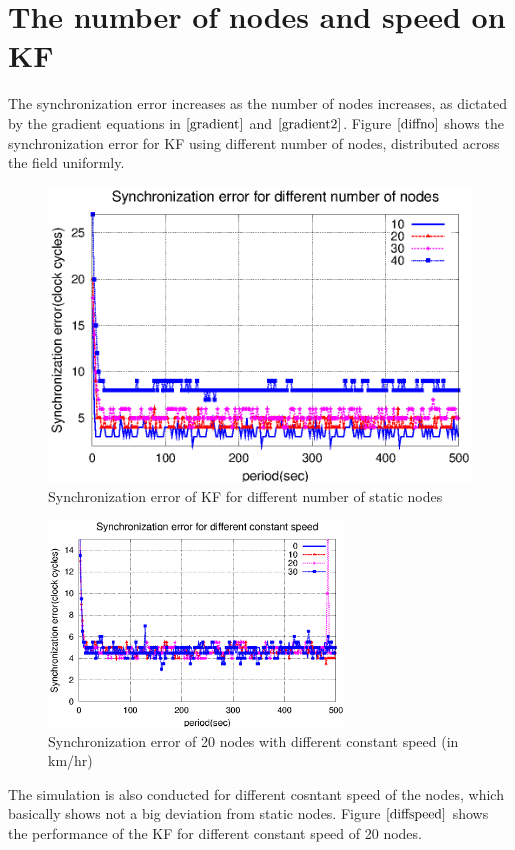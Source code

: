 \documentclass[a4paper,10pt]{report}
\begin{document}
\section{\textbf{The number of nodes and speed on KF}}
The synchronization error increases as the number of nodes increases, as dictated by the gradient equations in $\cite{gradient}$ and $\cite{gradient2}$. Figure $\ref{diffno}$ shows the synchronization error for KF using different number of nodes, distributed across the field uniformly.
\begin{figure}[!h]
\centering
\includegraphics[width= 0.7 \textwidth]{diffno}
\caption{Synchronization error of KF for different number of static nodes}
\label{diffno}
\end{figure}
\begin{figure}[!h]
\centering
\includegraphics[width = 0.7\textwidth]{diffspeed}
\caption{Synchronization error of 20 nodes with different constant speed (in km/hr)}
\label{diffspeed}
\end{figure}
The simulation is also conducted for different cosntant speed of the nodes, which basically shows not a big deviation from static nodes. Figure $\ref{diffspeed}$ shows the performance of the KF for different constant speed of 20 nodes.

\end{document}
